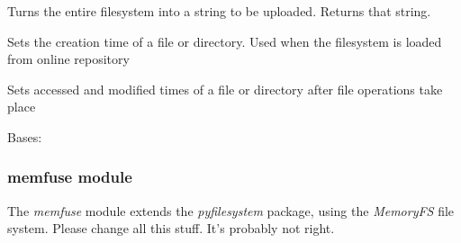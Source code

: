 \documentclass[letterpaper,10pt,english]{sphinxmanual}
\begin{document}
\begin{fulllineitems}
\begin{fulllineitems}
\end{fulllineitems}


\begin{fulllineitems}
\label{File_System:File_System.covertfs.CovertFS.save}
Turns the entire filesystem into a string to be uploaded.
Returns that string.

\end{fulllineitems}


\begin{fulllineitems}
\label{File_System:File_System.covertfs.CovertFS.setcreate}
Sets the creation time of a file or directory. Used when the filesystem is loaded from online repository

\end{fulllineitems}


\begin{fulllineitems}
\label{File_System:File_System.covertfs.CovertFS.settimes}
Sets accessed and modified times of a file or directory after file operations take place

\end{fulllineitems}


\end{fulllineitems}


\begin{fulllineitems}
\label{File_System:File_System.covertfs.CovertFile}
Bases: 

\end{fulllineitems}



\subsubsection{memfuse module}
\label{File_System:memfuse-module}
The \emph{memfuse} module extends the \emph{pyfilesystem} package, using the \emph{MemoryFS} file system.
Please change all this stuff. It's probably not right.
\label{File_System:module-File_System.memfuse}
\end{document}
